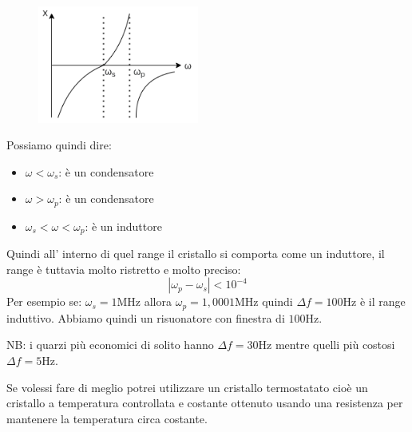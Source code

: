 \begin{figure}[H]
    \centering
    \includegraphics[width=200px]{images/17_Clock/impedence.png}
\end{figure}
Possiamo quindi dire:
\begin{itemize}
    \item $\omega < \omega_s$: è un condensatore
    \item $\omega > \omega_p$: è un condensatore
    \item $\omega_s < \omega < \omega_p$: è un induttore
\end{itemize}
Quindi all' interno di quel range il cristallo si comporta come un induttore, il range è tuttavia molto ristretto e molto preciso:
$$ |\omega_p - \omega_s| < 10^{-4} $$
Per esempio se: $\omega_s = 1$MHz allora $\omega_p = 1,0001$MHz quindi $\Delta{f} = 100$Hz è il range induttivo.
Abbiamo quindi un risuonatore con finestra di $100$Hz.

NB: i quarzi più economici di solito hanno $\Delta{f} = 30$Hz mentre quelli più costosi $\Delta{f} = 5$Hz.

Se volessi fare di meglio potrei utilizzare un cristallo termostatato cioè un cristallo a temperatura controllata e costante ottenuto usando una resistenza per mantenere la temperatura circa costante.


